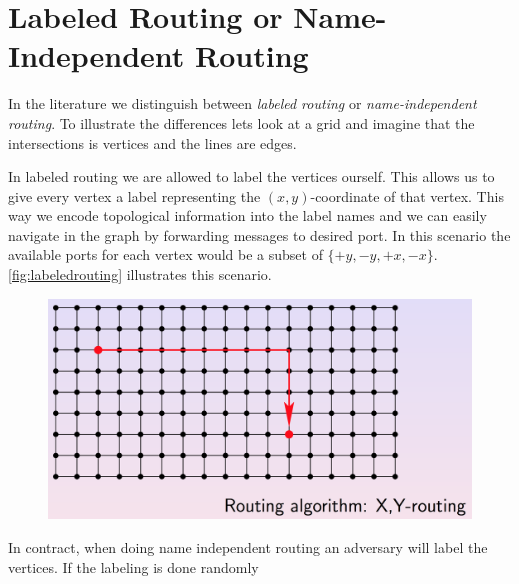 \section{Labeled Routing or Name-Independent Routing}
In the literature we distinguish between \emph{labeled routing} or
\emph{name-independent routing}. To illustrate the differences lets look at a
grid and imagine that the intersections is vertices and the lines are edges.

In labeled routing we are allowed to label the vertices ourself. This allows
us to give every vertex a label representing the $(x,y)$-coordinate of that
vertex. This way we encode topological information into the label names and we
can easily navigate in the graph by forwarding messages to desired port. In
this scenario the available ports for each vertex would be a subset of $\{+y,
-y, +x, -x\}$. \autoref{fig:labeledrouting} illustrates this scenario.
\begin{figure}[htbp]
    \centering
    \includegraphics[scale=0.3]{images/xyrouting.png} 
    \label{fig:labeledrouting}
\end{figure}

In contract, when doing name independent routing an adversary will label the
vertices. If the labeling is done randomly


 
 
